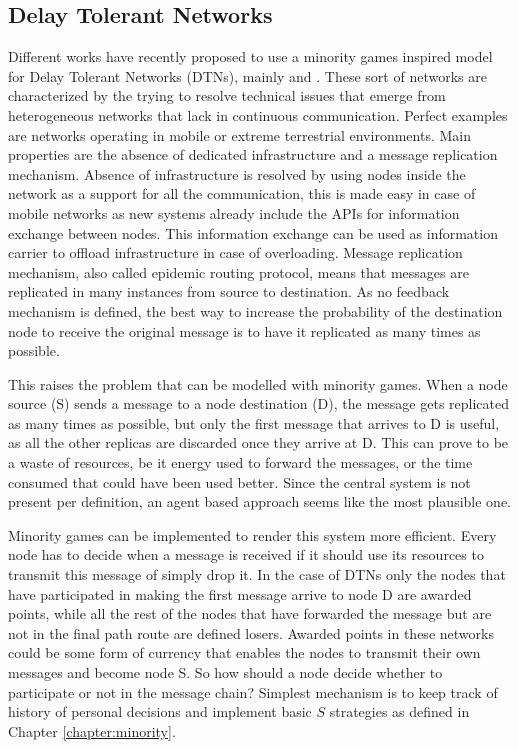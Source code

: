 \subsection{Delay Tolerant Networks}
\label{subsec:dtn}

Different works have recently proposed to use a minority games inspired model for Delay Tolerant Networks (DTNs), mainly \cite{sidi2012incentive} and \cite{sidi2013coordination}.
These sort of networks are characterized by the trying to resolve technical issues that emerge from heterogeneous networks that lack in continuous communication.
Perfect examples are networks operating in mobile or extreme terrestrial environments.
Main properties are the absence of dedicated infrastructure and a message replication mechanism.
Absence of infrastructure is resolved by using nodes inside the network as a support for all the communication, this is made easy in case of mobile networks as new systems already include the APIs for information exchange between nodes.
This information exchange can be used as information carrier to offload infrastructure in case of overloading.
Message replication mechanism, also called epidemic routing protocol, means that messages are replicated in many instances from source to destination.
As no feedback mechanism is defined, the best way to increase the probability of the destination node to receive the original message is to have it replicated as many times as possible.

This raises the problem that can be modelled with minority games.
When a node source (S) sends a message to a node destination (D), the message gets replicated as many times as possible, but only the first message that arrives to D is useful, as all the other replicas are discarded once they arrive at D.
This can prove to be a waste of resources, be it energy used to forward the messages, or the time consumed that could have been used better.
Since the central system is not present per definition, an agent based approach seems like the most plausible one.

Minority games can be implemented to render this system more efficient.
Every node has to decide when a message is received if it should use its resources to transmit this message of simply drop it.
In the case of DTNs only the nodes that have participated in making the first message arrive to node D are awarded points, while all the rest of the nodes that have forwarded the message but are not in the final path route are defined losers.
Awarded points in these networks could be some form of currency that enables the nodes to transmit their own messages and become node S.
So how should a node decide whether to participate or not in the message chain? 
Simplest mechanism is to keep track of history of personal decisions and implement basic $S$ strategies as defined in Chapter \ref{chapter:minority}.

